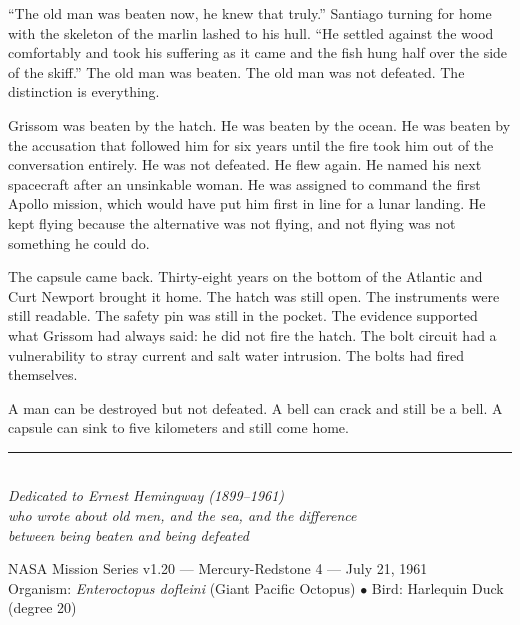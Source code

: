 \documentclass[12pt, letterpaper]{article}
\begin{document}
``The old man was beaten now, he knew that truly.'' Santiago turning for home with the skeleton of the marlin lashed to his hull. ``He settled against the wood comfortably and took his suffering as it came and the fish hung half over the side of the skiff.'' The old man was beaten. The old man was not defeated. The distinction is everything.

Grissom was beaten by the hatch. He was beaten by the ocean. He was beaten by the accusation that followed him for six years until the fire took him out of the conversation entirely. He was not defeated. He flew again. He named his next spacecraft after an unsinkable woman. He was assigned to command the first Apollo mission, which would have put him first in line for a lunar landing. He kept flying because the alternative was not flying, and not flying was not something he could do.

The capsule came back. Thirty-eight years on the bottom of the Atlantic and Curt Newport brought it home. The hatch was still open. The instruments were still readable. The safety pin was still in the pocket. The evidence supported what Grissom had always said: he did not fire the hatch. The bolt circuit had a vulnerability to stray current and salt water intrusion. The bolts had fired themselves.

A man can be destroyed but not defeated. A bell can crack and still be a bell. A capsule can sink to five kilometers and still come home.

\vspace{2em}
\begin{center}
\rule{3cm}{0.4pt}\\[1em]
\textit{Dedicated to Ernest Hemingway (1899--1961)\\who wrote about old men, and the sea, and the difference\\between being beaten and being defeated}
\end{center}

\vspace{2em}
\begin{center}
\small
NASA Mission Series v1.20 --- Mercury-Redstone 4 --- July 21, 1961\\
Organism: \textit{Enteroctopus dofleini} (Giant Pacific Octopus) $\bullet$ Bird: Harlequin Duck (degree 20)
\end{center}
\end{document}
